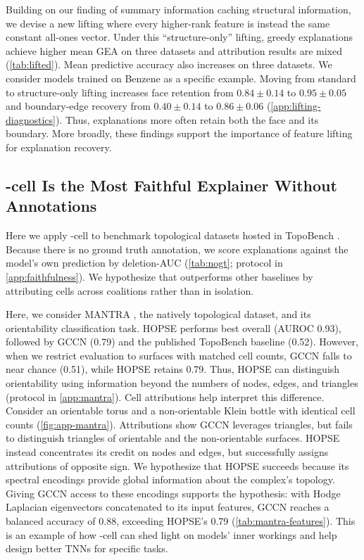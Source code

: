 Building on our finding of summary information caching structural information, we devise a new lifting where every higher-rank feature is instead the same constant all-ones vector. Under this ``structure-only'' lifting, greedy explanations achieve higher mean GEA on three datasets and attribution results are mixed (\cref{tab:lifted}). Mean predictive accuracy also increases on three datasets. We consider models trained on Benzene as a specific example. Moving from standard to structure-only lifting increases face retention from $0.84 \pm 0.14$ to $0.95 \pm 0.05$ and boundary-edge recovery from $0.40 \pm 0.14$ to $0.86 \pm 0.06$
(\cref{app:lifting-diagnostics}). Thus, explanations more often retain both the face and its boundary. More broadly, these findings support the importance of feature lifting
for explanation recovery. %



\subsection{\method-cell Is the Most Faithful Explainer Without Annotations}
\label{sec:predictions-nogt}

 Here we apply \method-cell to benchmark topological datasets hosted in TopoBench \citep{telyatnikov2024topobench}. Because there is no ground truth annotation, we score explanations against the model's own prediction by deletion-AUC (\cref{tab:nogt}; protocol in \cref{app:faithfulness}). We hypothesize that \method outperforms other baselines by attributing cells across coalitions rather than in isolation.

Here, we consider MANTRA \citep{ballester2025mantra}, the natively topological dataset, and its orientability classification task. HOPSE performs best overall (AUROC 0.93), followed by GCCN (0.79) and the published TopoBench baseline (0.52). However, when we restrict evaluation to surfaces with matched cell counts, GCCN falls to near chance (0.51), while HOPSE retains 0.79. Thus, HOPSE can distinguish orientability using information beyond the numbers of nodes, edges, and triangles (protocol in \cref{app:mantra}).  Cell attributions help interpret this difference. Consider an orientable torus and a non-orientable Klein bottle with identical cell counts (\cref{fig:app-mantra}). Attributions show GCCN leverages triangles, but fails to distinguish triangles of orientable and the non-orientable surfaces. HOPSE instead concentrates its credit on nodes and edges, but successfully assigns attributions of opposite sign. We hypothesize that HOPSE succeeds because its spectral encodings provide global information about the complex's topology. Giving GCCN access to these encodings supports the hypothesis: with Hodge Laplacian eigenvectors concatenated to its input features, GCCN reaches a balanced accuracy of 0.88, exceeding HOPSE's 0.79 (\cref{tab:mantra-features}). This is an example of how \method-cell can shed light on models' inner workings and help design better TNNs for specific tasks.
